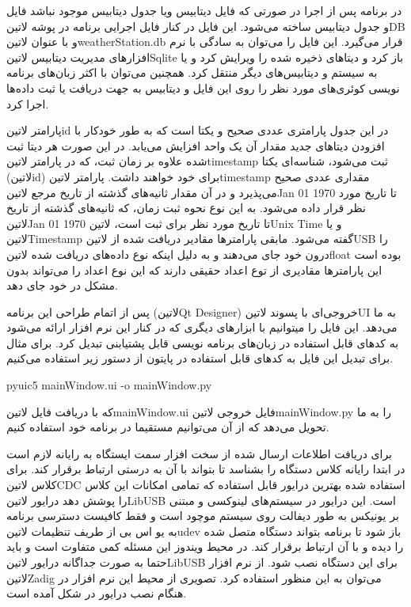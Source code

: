 در برنامه پس از اجرا در صورتی که فایل دیتابیس ویا جدول دیتابیس موجود نباشد فایل و جدول دیتابیس ساخته می‌شود. این فایل در کنار فایل اجرایی برنامه در پوشه ‌لاتین{DB} و با عنوان ‌لاتین{weatherStation.db} قرار می‌گیرد. این فایل را می‌توان به سادگی با نرم افزار‌های مدیریت دیتابیس ‌لاتین{Sqlite} باز کرد و دیتاهای ذخیره شده را ویرایش کرد و یا به سیستم‌ و دیتابیس‌های دیگر منتقل کرد. همچنین می‌توان با اکثر زبان‌های برنامه نویسی کوئری‌های مورد نظر را روی این فایل و دیتابیس به جهت دریافت یا ثبت داده‌ها اجرا کرد. 

پارامتر ‌لاتین{id} در این جدول پارامتری عددی صحیح و یکتا است که به طور خودکار با افزودن دیتا‌های جدید مقدار آن یک واحد افزایش می‌یابد. در این صورت هر دیتا ثبت شده علاوه بر زمان ثبت، که در پارامتر  ‌لاتین{timestamp} ثبت می‌شود، شناسه‌ای یکتا (‌لاتین{id}) برای خود خواهند داشت. پارامتر ‌لاتین{timestamp} مقداری عددی صحیح می‌پذیرد و در آن مقدار ثانیه‌های گذشته از تاریخ مرجع ‌لاتین{Jan 01 1970} تا تاریخ مورد نظر قرار داده می‌شود. به این نوع نحوه ثبت زمان، که ثانیه‌های گذشته از تاریخ ‌لاتین{Jan 01 1970} تا تاریخ مورد نظر برای ثبت است، ‌لاتین{Unix Time} و یا ‌لاتین{Timestamp} گفته می‌شود. مابقی پارامتر‌ها مقادیر دریافت شده از ‌لاتین{USB} را درون خود جای می‌دهند و به دلیل اینکه نوع داده‌های دریافت شده ‌لاتین{float} بوده است این پارامترها مقادیری از توع اعداد حقیقی دارند که این نوع اعداد را می‌تواند بدون مشکل در خود جای دهد.

پس از اتمام طراحی این برنامه (‌لاتین{Qt Designer}) خروجی‌ای با پسوند ‌لاتین{UI} به ما می‌دهد. این فایل را میتوانیم با ابزار‌های دیگری که در کنار این نرم افزار ارائه می‌شود به کد‌های قابل استفاده در زبان‌های برنامه نویسی قابل پشتیابنی تبدیل کرد. برای مثال برای تبدیل این فایل به کد‌های قابل استفاده در پایتون از دستور زیر استفاده می‌کنیم. 

\begin{latin}
	\noindent
	pyuic5 mainWindow.ui -o mainWindow.py
\end{latin}

\noindent
که با دریافت فایل ‌لاتین{mainWindow.ui} فایل خروجی ‌لاتین{mainWindow.py} را به ما تحویل می‌دهد که از آن می‌توانیم مستقیما در برنامه خود استفاده کنیم.

برای دریافت اطلاعات ارسال شده از سخت افزار سمت ایستگاه به رایانه لازم است در ابتدا رایانه کلاس دستگاه را بشناسد تا بتواند با آن به درستی ارتباط برقرار کند. برای کلاس ‌لاتین{CDC} استفاده شده بهترین درایور قابل استفاده که تمامی امکانات این کلاس را پوشش دهد درایور ‌لاتین{LibUSB} است. این درایور در سیستم‌های لینوکسی و مبتنی بر یونیکس به طور دیفالت روی سیستم موچود است و فقط کافیست دسترسی برنامه به یو اس بی از طریف تنظیمات ‌لاتین{udev} باز شود تا برنامه بتواند دستگاه متصل شده را دیده و با آن ارتباط برقرار کند. در محیط ویندوز این مسئله کمی متفاوت است و باید حتما به صورت جداگانه درایور ‌لاتین{LibUSB} برای این دستگاه نصب شود. از نرم افزار ‌لاتین{Zadig} می‌توان به این منظور استفاده کرد. تصویری از محیط این نرم افزار در هنگام نصب درایور در شکل  آمده است.

